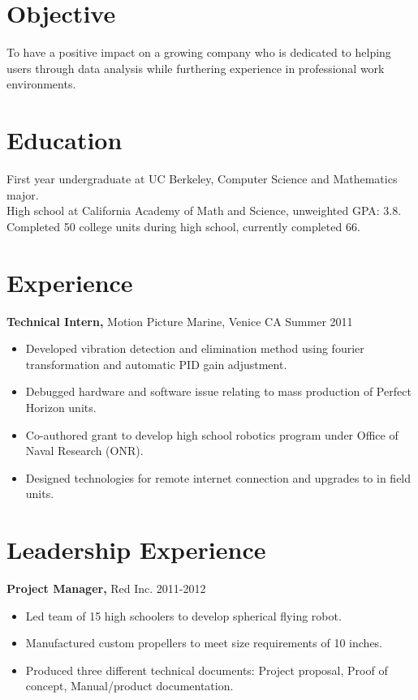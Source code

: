 \documentclass[margin]{res}
\begin{document}
\begin{resume}

\section{Objective}
To have a positive impact on a growing company who is dedicated to helping users through data analysis while furthering experience in professional work environments.

\section{Education}
First year undergraduate at UC Berkeley, Computer Science and Mathematics major. \\
High school at California Academy of Math and Science, unweighted GPA: 3.8. \\
Completed 50 college units during high school, currently completed 66.


\section{Experience}
{\bf Technical Intern,} Motion Picture Marine, Venice CA \hfill Summer 2011
\begin{itemize} \itemsep -2pt  %
  \item Developed vibration detection and elimination method using fourier transformation and automatic PID gain adjustment.
  \item Debugged hardware and software issue relating to mass production of Perfect Horizon units.
  \item Co-authored grant to develop high school robotics program under Office of Naval Research (ONR).
  \item Designed technologies for remote internet connection and upgrades to in field units.
\end{itemize}


\section{Leadership Experience}
{\bf Project Manager,} Red Inc. \hfill 2011-2012
\begin{itemize} \itemsep -2pt
  \item Led team of 15 high schoolers to develop spherical flying robot.
  \item Manufactured custom propellers to meet size requirements of 10 inches.
  \item Produced three different technical documents: Project proposal, Proof of concept, Manual/product documentation.
\end{itemize}


\end{resume}
\end{document}
